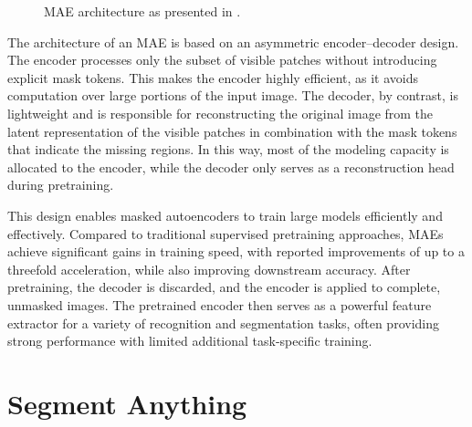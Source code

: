 \begin{figure}[!ht]
    \centering
    \caption{MAE architecture as presented in \cite{LeCun.1989}.}
    \label{fig:MAE}
\end{figure}

The architecture of an MAE is based on an asymmetric encoder–decoder design. The encoder processes only the subset of visible patches without introducing explicit mask tokens. This makes the encoder highly efficient, as it avoids computation over large portions of the input image. The decoder, by contrast, is lightweight and is responsible for reconstructing the original image from the latent representation of the visible patches in combination with the mask tokens that indicate the missing regions. In this way, most of the modeling capacity is allocated to the encoder, while the decoder only serves as a reconstruction head during pretraining. 

This design enables masked autoencoders to train large models efficiently and effectively. Compared to traditional supervised pretraining approaches, MAEs achieve significant gains in training speed, with reported improvements of up to a threefold acceleration, while also improving downstream accuracy. After pretraining, the decoder is discarded, and the encoder is applied to complete, unmasked images. The pretrained encoder then serves as a powerful feature extractor for a variety of recognition and segmentation tasks, often providing strong performance with limited additional task-specific training. 



\section{Segment Anything}


